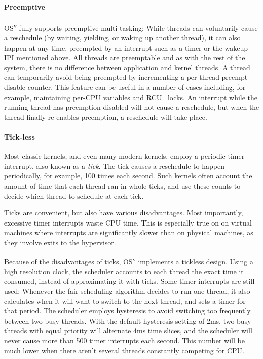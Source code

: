 \documentclass{sig-alternate}
\begin{document}
\paragraph{Preemptive} OS\textsuperscript{v} fully supports preemptive multi-tasking:
While threads can voluntarily cause a reschedule (by waiting, yielding, or 
waking up another thread), it can also happen at any time, preempted
by an interrupt such as a timer or the wakeup IPI mentioned above.
All threads are preemptable and as with the rest of the system, there is no difference between application 
and kernel threads. A thread can temporarily avoid being preempted by
incrementing a per-thread preempt-disable counter. This feature can
be useful in a number of cases including, for example, maintaining per-CPU
variables and RCU~\cite{RCU} locks. An interrupt while the running thread 
has preemption disabled will not cause a reschedule, but when the thread
finally re-enables preemption, a reschedule will take place.


\paragraph{Tick-less}
Most classic kernels, and even many modern kernels, employ a periodic timer
interrupt, also known as a \emph{tick}. The tick causes a reschedule to happen periodically,
for example, 100 times each second. Such kernels often account the amount of time that
each thread ran in whole ticks, and use these counts to decide which thread
to schedule at each tick.

Ticks are convenient, but also have various disadvantages. Most importantly,
excessive timer interrupts waste CPU time. This is especially true on
on virtual machines where interrupts are significantly slower than on
physical machines, as they involve exits to the hypervisor.

Because of the disadvantages of ticks, OS\textsuperscript{v} implements a tickless design. Using
a high resolution clock, the scheduler
accounts to each thread the exact time it consumed, instead of approximating it with ticks.
Some timer interrupts are still
used: Whenever the fair scheduling algorithm
decides to run one thread, it also calculates when it will want to switch
to the next thread, and sets a timer for that period. The scheduler employs
hysteresis to avoid switching too frequently between two busy threads.
With the default hysteresis setting of 2ms, two busy threads with equal
priority will alternate 4ms time slices, and the scheduler will never
cause more than 500 timer interrupts each second. This number will
be much lower when there aren't several threads constantly competing for CPU.
\end{document}
